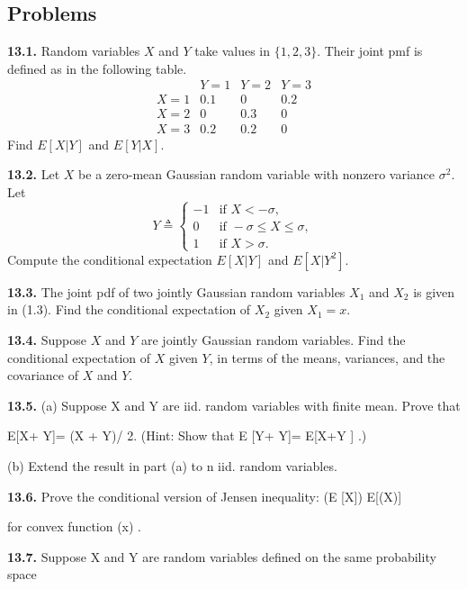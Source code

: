 \subsection*{Problems}

\textbf{13.1.} Random variables $X$ and $Y$ take values in $\{1,2,3\}$. Their joint pmf is defined as in the following table.
\[
\begin{array}{c|ccc}
 & Y=1 & Y=2 & Y=3\\
\hline
X=1 & 0.1 & 0 & 0.2\\
X=2 & 0 & 0.3 & 0\\
X=3 & 0.2 & 0.2 & 0
\end{array}
\]
Find $E[X\vert Y]$ and $E[Y\vert X]$.

\textbf{13.2.} Let $X$ be a zero-mean Gaussian random variable with nonzero variance $\sigma^2$. Let
\[
Y \triangleq
\begin{cases}
-1 & \text{if } X<-\sigma,\\
0 & \text{if } -\sigma \leq X \leq \sigma,\\
1 & \text{if } X>\sigma.
\end{cases}
\]
Compute the conditional expectation $E[X\vert Y]$ and $E[X\vert Y^2]$.

\textbf{13.3.} The joint pdf of two jointly Gaussian random variables $X_1$ and $X_2$ is given in (1.3). Find the conditional expectation of $X_2$ given $X_1=x$.

\textbf{13.4.} Suppose $X$ and $Y$ are jointly Gaussian random variables. Find the conditional expectation of $X$ given $Y$, in terms of the means, variances, and the covariance of $X$ and $Y$.

\textbf{13.5.} (a) Suppose X and Y are iid. random variables with finite mean. Prove that

E[X\vertX + Y]= (X + Y)/ 2. (Hint: Show that E [Y\vertX + Y]= E[X\vertX +Y ] .)

(b) Extend the result in part (a) to n iid. random variables.

\textbf{13.6.} Prove the conditional version of Jensen inequality: \phi(E [X\vert{}]) \leq E[\phi(X)\vert{}]

for convex function \phi(x) .

\textbf{13.7.} Suppose X and Y are random variables defined on the same probability space

